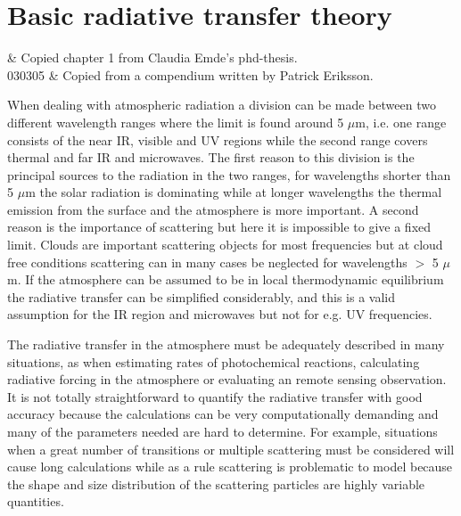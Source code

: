 \graphicspath{{Figs/rte_theory/}}

\newcommand{\ColVctTwo}[2]{\left[
    \begin{array}{c} #1\\ #2
    \end{array} \right] }

\newcommand{\ColVctFour}[4]{\left[
    \begin{array}{c} #1\\ #2 \\ #3 \\ #4
    \end{array} \right] }

\chapter{Basic radiative transfer theory}
 \label{sec:rte_theory}


 & Copied chapter 1 from Claudia Emde's phd-thesis. \\
  030305 & Copied from a compendium written by Patrick Eriksson.
\stophistory


 When dealing with atmospheric radiation a division can be made
 between two different wavelength ranges where the limit is found
 around 5 $\mu$m, i.e. one range consists of the near IR, visible and UV
 regions while the second range covers thermal and far IR and
 microwaves. The first reason to this division is the principal
 sources to the radiation in the two ranges, for wavelengths shorter
 than 5 $\mu$m the solar radiation is dominating while at longer
 wavelengths the thermal emission from the surface and the atmosphere
 is more important. A second reason is the importance of scattering
 but here it is impossible to give a fixed limit. Clouds are important
 scattering objects for most frequencies but at cloud free conditions
 scattering can in many cases be neglected for wavelengths $>$ 5 $\mu$m. If
 the atmosphere can be assumed to be in local thermodynamic
 equilibrium the radiative transfer can be simplified considerably,
 and this is a valid assumption for the IR region and microwaves but
 not for e.g. UV frequencies.
 
 The radiative transfer in the atmosphere must be adequately described
 in many situations, as when estimating rates of photochemical
 reactions, calculating radiative forcing in the atmosphere or
 evaluating an remote sensing observation. It is not totally
 straightforward to quantify the radiative transfer with good accuracy
 because the calculations can be very computationally demanding and
 many of the parameters needed are hard to determine. For example,
 situations when a great number of transitions or multiple scattering
 must be considered will cause long calculations while as a rule
 scattering is problematic to model because the shape and size
 distribution of the scattering particles are highly variable
 quantities.  

